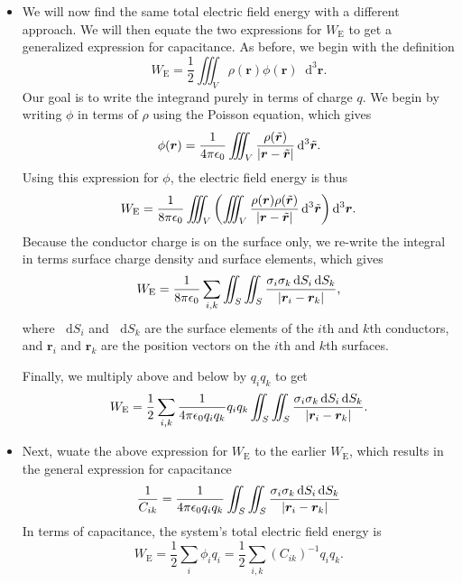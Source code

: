 \documentclass[11pt, a4paper]{article}
\newcommand{\diff}{\mathop{}\!\mathrm{d}} %
\newcommand{\dr}{\diff^{3} \r}  %
\newcommand{\dtr}{\diff^{3} \tilde{\r}}  %
\renewcommand{\vec}[1]{\bm{#1}} %
\renewcommand{\t}[1]{\tilde{#1}} %
\renewcommand{\r}{\vec{r}}
\newcommand{\ee}{\epsilon_{0}}  %
\begin{document}
\begin{itemize}
	\item We will now find the same total electric field energy with a different approach. We will then equate the two expressions for $ W_{\text{E}} $ to get a generalized expression for capacitance. As before, we begin with the definition
	\begin{equation*}
		W_{\text{E}} = \frac{1}{2}\iiint_{V} \rho(\r) \phi(\r) \dr.
	\end{equation*}
	Our goal is to write the integrand purely in terms of charge $ q $. We begin by writing $ \phi $ in terms of $ \rho $ using the Poisson equation, which gives
	\begin{equation*}
		\phi(\r) = \frac{1}{4\pi \ee}\iiint_{V}\frac{\rho(\t{\r})}{\abs{\r - \t{\r}}} \dtr.
	\end{equation*}
    Using this expression for $ \phi $, the electric field energy is thus
	\begin{equation*}
		W_{\text{E}} = \frac{1}{8\pi \ee} \iiint_{V}\left(\iiint_{V} \frac{\rho(\r)\rho(\t{\r})}{\abs{\r - \t{\r}}}\dtr \right) \dr.
	\end{equation*}
	Because the conductor charge is on the surface only, we re-write the integral in terms surface charge density and surface elements, which gives
	\begin{equation*}
		W_{\text{E}} = \frac{1}{8\pi \ee}\sum_{i, k} \iint_{S} \iint_{S} \frac{\sigma_{i}\sigma_{k}\diff S_{i}\diff S_{k}}{\abs{\r_{i} - \r_{k}}},
	\end{equation*}
	where $ \diff S_{i} $ and $ \diff S_{k} $ are the surface elements of the $ i $th and $ k $th conductors, and $ \r_{i} $ and $ \r_{k} $ are the position vectors on the $ i $th and $ k $th surfaces. 
	
	Finally, we multiply above and below by $ q_{i}q_{k} $ to get
	\begin{equation*}
		W_{\text{E}} = \frac{1}{2} \sum_{i, k} \frac{1}{4\pi \ee q_{i}q_{k}}q_{i}q_{k} \iint_{S} \iint_{S} \frac{\sigma_{i}\sigma_{k}\diff S_{i}\diff S_{k}}{\abs{\r_{i} - \r_{k}}}.
	\end{equation*}
	
	\item Next, wuate the above expression for $ W_{\text{E}} $ to the earlier $ W_{\text{E}} $, which results in the general expression for capacitance
	\begin{equation*}
		\frac{1}{C_{ik}} = \frac{1}{4\pi \ee q_{i} q_{k}} \iint_{S} \iint_{S} \frac{\sigma_{i}\sigma_{k}\diff S_{i}\diff S_{k}}{\abs{\r_{i} - \r_{k}}}
	\end{equation*}
	In terms of capacitance, the system's total electric field energy is
	\begin{equation*}
		W_{\text{E}} = \frac{1}{2}\sum_{i}\phi_{i}q_{i} = \frac{1}{2}\sum_{i, k}(C_{ik})^{-1}q_{i}q_{k}.
	\end{equation*}


\end{itemize}
\end{document}
